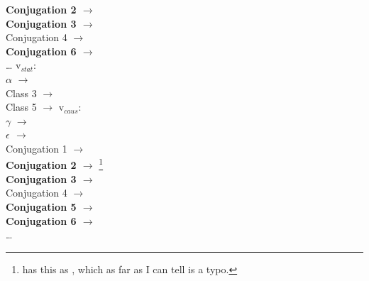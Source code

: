 \begin{exe}
\begin{xlist}
\begin{xlist}
\begin{exe}
\begin{exe}
\begin{xlist}
\begin{exe}
\begin{xlist}
\begin{exe}
\begin{xlist}
\begin{xlist}
\begin{exe}
\begin{xlist}
\begin{exe}
\begin{xlist}
\begin{exe}
\begin{xlist}
\begin{exe}
\begin{exe}
\begin{exe}
\begin{xlist}
\begin{exe}
\begin{exe}
\begin{xlist}
\begin{xlist}
\begin{exe}
\begin{xlist}
\begin{exe}
\begin{exe}
\begin{xlist}
\begin{exe}
\begin{exe}
\begin{xlist}
\begin{exe}
\begin{xlist}
\begin{exe}
\begin{xlist}
\begin{exe}
\begin{xlist}
\begin{exe}
\begin{exe}
\begin{xlist}
\begin{exe}
\begin{exe}
\begin{xlist}
\begin{xlist}
\begin{exe}
\begin{xlist}
\begin{xlist}
\begin{exe}
\begin{xlist}
\begin{exe}
\begin{xlist}
\begin{exe}
\begin{xlist}
\begin{exe}
\begin{xlist}
\begin{exe}
\begin{exe}
\begin{exe}
\begin{exe}
\begin{xlist}
\begin{exe}
\begin{exe}
\begin{xlist}
\begin{xlist}
\begin{exe}
\begin{exe}
\begin{xlist}
\begin{exe}
\begin{xlist}
\begin{multicols}{2}
			\textbf{Conjugation 2 $\rightarrow$ {\tkal}}\\
			\textbf{Conjugation 3 $\rightarrow$ {\tnif}}\\
			Conjugation 4 $\rightarrow$ {\thit}\\
			\textbf{Conjugation 6 $\rightarrow$ {\thif}}\\
			\dots
		\columnbreak
 	\ex  v$_{stat}$: \\
			$ \alpha$ $\rightarrow$ {\tkal} \\
			Class 3 $\rightarrow$ {\tkal}\\
			Class 5 $\rightarrow$ {\tkal}
 	\ex  v$_{caus}$: \\
			$\gamma$ $\rightarrow$ {\tpie}\\
			\textbf{$\epsilon$ $\rightarrow$ {\thif}}\\
			Conjugation 1 $\rightarrow$ {\tkal}\\
			\textbf{Conjugation 2 $\rightarrow$ {\thif}}\footnote{\citet[231]{arad05} has this as {\tnif}, which as far as I can tell is a typo.}\\
			\textbf{Conjugation 3 $\rightarrow$ {\thif}}\\
			Conjugation 4 $\rightarrow$ {\tpie}\\
			\textbf{Conjugation 5 $\rightarrow$ {\thif}}\\
			\textbf{Conjugation 6 $\rightarrow$ {\thif}}\\
			\dots
	\end{multicols}
 \z
\z 


\end{xlist}
\end{exe}
\end{xlist}
\end{exe}
\end{exe}
\end{xlist}
\end{xlist}
\end{exe}
\end{exe}
\end{xlist}
\end{exe}
\end{exe}
\end{exe}
\end{exe}
\end{xlist}
\end{exe}
\end{xlist}
\end{exe}
\end{xlist}
\end{exe}
\end{xlist}
\end{exe}
\end{xlist}
\end{xlist}
\end{exe}
\end{xlist}
\end{xlist}
\end{exe}
\end{exe}
\end{xlist}
\end{exe}
\end{exe}
\end{xlist}
\end{exe}
\end{xlist}
\end{exe}
\end{xlist}
\end{exe}
\end{xlist}
\end{exe}
\end{exe}
\end{xlist}
\end{exe}
\end{exe}
\end{xlist}
\end{exe}
\end{xlist}
\end{xlist}
\end{exe}
\end{exe}
\end{xlist}
\end{exe}
\end{exe}
\end{exe}
\end{xlist}
\end{exe}
\end{xlist}
\end{exe}
\end{xlist}
\end{exe}
\end{xlist}
\end{xlist}
\end{exe}
\end{xlist}
\end{exe}
\end{xlist}
\end{exe}
\end{exe}
\end{xlist}
\end{xlist}
\end{exe}
